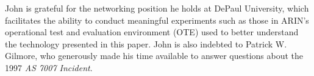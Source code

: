 \documentclass[sigconf]{acmart}
\begin{document}
\begin{acks}

John is grateful for the networking position he holds at DePaul
University, which facilitates the ability to conduct meaningful
experiments such as those in ARIN's operational test and evaluation
environment (OTE) used to better understand the technology presented in
this paper.  John is also indebted to Patrick W.  Gilmore, who
generously made his time available to answer questions about the 1997
\emph{AS 7007 Incident}.

\end{acks}


\end{document}

